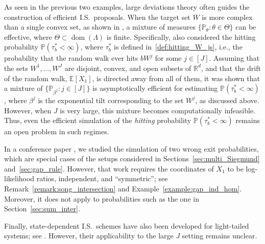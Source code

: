 \documentclass[aap,preprint]{imsart}
\newcommand{\Pro}{{\mathbb{P}}}
\theoremstyle{plain}
\theoremstyle{definition}
\begin{document}
As seen in the previous two examples, large deviations theory \citep{dembo2009large,borovkov2012large} often guides the construction of efficient I.S.~proposals. When the target set $W$ is more complex than a single convex set, as shown in \citet{sadowsky1990large,collamore2002}, a mixture of measures $\{\Pro_{\theta} : \theta \in \Theta\}$ can be effective, where $\Theta \subset \operatorname{dom}(\Lambda)$ is finite. Specifically, \citet{collamore2002} also considered the hitting probability $\Pro(\tau_b^* < \infty)$, where $\tau_b^*$ is defined in~\eqref{def:hitting_W_js}, i.e., the probability that the random walk ever hits $bW^j$ for some $j \in [J]$. Assuming that the sets $W^1, \ldots, W^J$ are disjoint, convex, and open subsets of $\mathbb{R}^d$, and that the drift of the random walk, $\mathbb{E}[X_1]$, is directed away from all of them, it was shown that a mixture of $\{\Pro_{\beta^j} : j \in [J]\}$ is asymptotically efficient for estimating $\Pro(\tau_b^* < \infty)$, where $\beta^j$ is the exponential tilt corresponding to the set $W^j$, as discussed above. However, when $J$ is very large, this mixture becomes computationally infeasible. Thus, even the efficient simulation of the \emph{hitting} probability $\Pro(\tau_b^* < \infty)$ remains an open problem in such regimes.


In a conference paper \citep{song2016logarithmically}, we studied the simulation of two wrong exit probabilities, which are special cases of the setups considered in Sections~\ref{sec:multi_Siegmund} and~\ref{sec:gap_rule}. However, that work requires 
the coordinates of 
$X_1$ to be log-likelihood ratios, independent, and “symmetric”; see Remark~\ref{remark:song_intersection} and Example~\ref{example:gap_ind_hom}. Moreover, it does not apply to probabilities such as the one in Section~\ref{sec:sum_inter}. 

Finally, state-dependent I.S.~schemes have also been developed for light-tailed systems; see \cite{DupuisWang2007,DupuisSezerWang2007}. However, their applicability to the large $J$ setting remains unclear.

\end{document}
